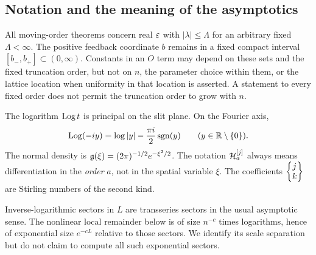 \subsection{Notation and the meaning of the asymptotics}

All moving-order theorems concern real $\varepsilon$ with
$|\lambda|\le\Lambda$ for an arbitrary fixed $\Lambda<\infty$.
The positive feedback coordinate $b$ remains in a fixed compact interval
$[b_-,b_+]\subset(0,\infty)$. Constants in an $O$ term may depend on
these sets and the fixed truncation order, but not on $n$, the parameter
choice within them, or the lattice location when uniformity in that
location is asserted. A statement to every fixed order does not permit
the truncation order to grow with $n$.

The logarithm $\operatorname{Log} t$ is principal on the slit plane. On the Fourier
axis,
\begin{equation}\label{eq:fourier-log}
 \operatorname{Log}(-iy)=\log|y|-\frac{\pi i}{2}\operatorname{sgn}(y)
 \qquad(y\in\mathbb R\setminus\{0\}).
\end{equation}
The normal density is
$\mathfrak g(\xi)=(2\pi)^{-1/2}e^{-\xi^2/2}$.
The notation $\mathcal H_a^{[j]}$ always means differentiation in the
\emph{order} $a$, not in the spatial variable $\xi$.
The coefficients $\left\{\begin{matrix}j\\k\end{matrix}\right\}$ are Stirling numbers of the second kind.

Inverse-logarithmic sectors in $L$ are transseries sectors in the usual
asymptotic sense. The nonlinear local remainder below is of size
$n^{-c}$ times logarithms, hence of exponential size $e^{-cL}$ relative
to those sectors. We identify its scale separation but do not claim
to compute all such exponential sectors.
